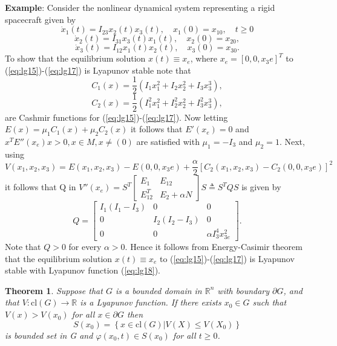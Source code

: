 \documentclass[a4paper]{report}
\newtheorem{thm}{Theorem}
\theoremstyle{definition}
\begin{document}
\textbf{Example}: Consider the nonlinear dynamical system representing a rigid spacecraft given by
\begin{equation}
\dot{x}_1(t)=I_{23}x_2(t)x_3(t), \quad x_1(0)=x_{10}, \quad t\ge 0
\label{eq:lg15}
\end{equation}
\begin{equation}
\dot{x}_2(t)=I_{31}x_3(t)x_1(t), \quad x_2(0)=x_{20},
\label{eq:lg16}
\end{equation}
\begin{equation}
\dot{x}_3(t)=I_{12}x_1(t)x_2(t), \quad x_3(0)=x_{30}.
\label{eq:lg17}
\end{equation}
To show that the equilibrium solution $x(t)\equiv{x_e}$, where $x_e=[0,0,x_3e]^T$ to (\ref{eq:lg15})-(\ref{eq:lg17}) is Lyapunov stable note that
\begin{equation}
C_1(x)=\frac{1}{2}(I_1 x_1^2 +I_2 x_2^2 +I_3 x_3^3),
\end{equation}
\begin{equation}
C_2(x)=\frac{1}{2}(I_1^2 x_1^2 +I^2_2 x_2^2 +I^2_3 x_3^3),
\end{equation}
are Cashmir functions for (\ref{eq:lg15})-(\ref{eq:lg17}). Now letting $E(x)=\mu_1 C_1(x) +\mu_2 C_2 (x)$ it follows that $E'(x_e)=0$ and $x^T E''(x_e) x >0, x\in M,x\neq(0)$ are satisfied with $\mu_1= -I_3 $ and $\mu_2=1$. Next, using
\begin{equation}
V(x_1,x_2,x_3)= E(x_1,x_2,x_3)-E(0,0,x_3e)+\frac{\alpha}{2}[C_2(x_1,x_2,x_3)-C_2(0,0,x_3e)]^2
\label{eq:lg18}
\end{equation}
it follows that Q in $V''(x_e)=S^T\begin{bmatrix}
E_1 & E_{12}\\
E_{12}^T & E_2+\alpha N
\end{bmatrix}
S\triangleq S^TQS$ is given by
\begin{equation}
Q=\begin{bmatrix}
I_1(I_1-I_3) & 0 & 0\\
0 & I_2(I_2-I_3) & 0\\
0 & 0 & \alpha I_3^4x_{3e}^2
\end{bmatrix}.
\end{equation}
Note that $Q>0$ for every $\alpha>0$. Hence it follows from Energy-Casimir theorem that the equilibrium solution $x(t)\equiv x_e$ to (\ref{eq:lg15})-(\ref{eq:lg17}) is Lyapunov stable with Lyapunov function (\ref{eq:lg18}).
\\
\begin{mdframed}[backgroundcolor=airforceblue!25] 
\begin{thm} \label{thm:1}
Suppose that $G$ is a bounded domain in ${\mathbb{R}^{n}}$ with boundary $\partial G$, and that $V:\text{cl}(G) \longrightarrow \mathbb{R}$ is a Lyapunov function. If there exists $x_0 \in G$ such that $V(x)>V(x_0)$ for all $x\in \partial G$ then
$$S(x_0) = \left\{x \in \text{cl}(G)|V(X) \leq V(X_0)\right\}$$ is bounded set in G and $\varphi(x_0,t) \in S(x_0)$ for all $t\geq 0$.
\end{thm}
\end{mdframed}
\end{document}
